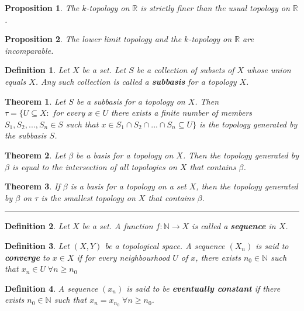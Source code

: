 \documentclass[14pt,twoside]{extreport}
\newcommand{\hhrule}{\vspace{1cm}\hrule\vspace{1cm}}
\theoremstyle{dotless}
\newtheorem*{defn}{Definition}
\newtheorem*{thm}{Theorem} %
\newtheorem*{prop}{Proposition} %
\begin{document}
\begin{prop}
    The $k$-topology on $\mathbb{R}$ is strictly finer than the usual topology on $\mathbb{R}$.
\end{prop}

\begin{prop}
    The lower limit topology and the $k$-topology on $\mathbb{R}$ are incomparable.
\end{prop}


\begin{defn}
    Let $X$ be a set. Let $S$ be a collection of subsets of $X$ whose union equals $X$. Any such collection is called a \textbf{subbasis} for a topology $X$.
\end{defn}

\begin{thm}
    Let $S$ be a subbasis for a topology on $X$. Then
    \\ $\tau = \{ U \subseteq X  :  $ for every $ x \in U $ there exists a finite number of members $ S_1, S_2, ..., S_n \in S $ such that $ x \in S_1 \cap S_2 \cap ... \cap S_n \subseteq U \}$ is the topology generated by the subbasis $S$.
\end{thm}

\begin{thm}
    Let $\beta$ be a basis for a topology on $X$. Then the topology generated by $\beta$ is equal to the intersection of all topologies on $X$ that contains $\beta$.
\end{thm}

\begin{thm}
    If $\beta$ is a basis for a topology on a set $X$, then the topology generated by $\beta$ on $\tau$ is the smallest topology on $X$ that contains $\beta$.
\end{thm}

\hhrule

\begin{defn}
    Let $X$ be a set. A function $f \colon \mathbb{N} \to X$ is called a \textbf{sequence} in $X$.
\end{defn}

\begin{defn}
    Let $\left (X, Y\right )$ be a topological space. A sequence $\left (X_n\right )$ is said to \textbf{converge} to $x \in X$ if for every neighbourhood $U$ of $x$, there exists $n_0 \in \mathbb{N}$ such that $x_n \in U \;\forall n \geq n_0$
\end{defn}

\begin{defn}
    A sequence $\left (x_n\right )$ is said to be \textbf{eventually constant} if there exists $n_0 \in \mathbb{N}$ such that $x_n = x_{n_0} \;\forall n \geq n_0$.
\end{defn}
\end{document}
